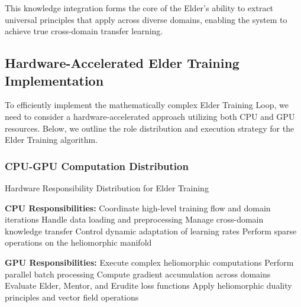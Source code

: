 This knowledge integration forms the core of the Elder's ability to extract universal principles that apply across diverse domains, enabling the system to achieve true cross-domain transfer learning.

\subsection{Hardware-Accelerated Elder Training Implementation}

To efficiently implement the mathematically complex Elder Training Loop, we need to consider a hardware-accelerated approach utilizing both CPU and GPU resources. Below, we outline the role distribution and execution strategy for the Elder Training algorithm.

\subsubsection{CPU-GPU Computation Distribution}

\begin{algorithm}
\caption{Hardware Responsibility Distribution for Elder Training}
\begin{algorithmic}[1]
\State \textbf{CPU Responsibilities:}
\State \hspace{\algorithmicindent} Coordinate high-level training flow and domain iterations
\State \hspace{\algorithmicindent} Handle data loading and preprocessing
\State \hspace{\algorithmicindent} Manage cross-domain knowledge transfer
\State \hspace{\algorithmicindent} Control dynamic adaptation of learning rates
\State \hspace{\algorithmicindent} Perform sparse operations on the heliomorphic manifold

\State \textbf{GPU Responsibilities:}
\State \hspace{\algorithmicindent} Execute complex heliomorphic computations
\State \hspace{\algorithmicindent} Perform parallel batch processing
\State \hspace{\algorithmicindent} Compute gradient accumulation across domains
\State \hspace{\algorithmicindent} Evaluate Elder, Mentor, and Erudite loss functions
\State \hspace{\algorithmicindent} Apply heliomorphic duality principles and vector field operations
\end{algorithmic}
\end{algorithm}

